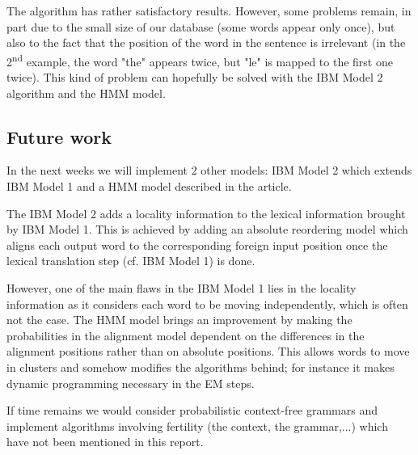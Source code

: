 \documentclass[10pt]{article}
\begin{document}
The algorithm has rather satisfactory results. However, some problems remain, in part due to the small size of our database (some words appear only once), but also to the fact that the position of the word in the sentence is irrelevant (in the 2\textsuperscript{nd} example, the word "the" appears twice, but "le" is mapped to the first one twice). This kind of problem can hopefully be solved with the IBM Model 2 algorithm and the HMM model.

\subsection{Future work}
In the next weeks we will implement 2 other models: IBM Model 2 which extends IBM Model 1 and a HMM model described in the article.

The IBM Model 2 adds a locality information to the lexical information brought by IBM Model 1. This is achieved by adding an absolute reordering model which aligns each output word to the corresponding foreign input position once the lexical translation step (cf. IBM Model 1) is done.

However, one of the main flaws in the IBM Model 1 lies in the locality information as it considers each word to be moving independently, which is often not the case. The HMM model brings an improvement by making the probabilities in the alignment model dependent on the differences in the alignment positions rather than on absolute positions. This allows words to move in clusters and somehow modifies the algorithms behind; for instance it makes dynamic programming necessary in the EM steps.

If time remains we would consider probabilistic context-free grammars and implement algorithms involving fertility (the context, the grammar,...) which have not been mentioned in this report.
\end{document}
